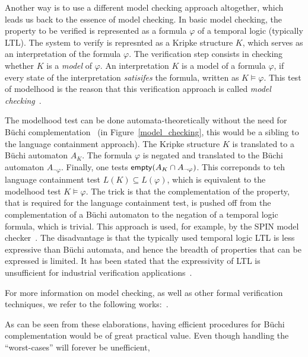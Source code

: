 Another way is to use a different model checking approach altogether, which leads us back to the essence of model checking. In basic model checking, the property to be verified is represented as a formula $\varphi$ of a temporal logic (typically LTL). The system to verify is represnted as a Kripke structure $K$, which serves as an interpretation of the formula $\varphi$. The verification step consists in checking whether $K$ is a \textit{model} of $\varphi$. An interpretation $K$ is a model of a formula $\varphi$, if every state of the interpretation \textit{satisifes} the formula, written as $K \models \varphi$. This test of modelhood is the reason that this verification approach is called \textit{model checking}~\cite{1996_vardi}.

The modelhood test can be done automata-theoretically without the need for Büchi complementation~\cite{2007_vardi_model_checking} (in Figure~\ref{model_checking}, this would be a sibling to the language containment approach). The Kripke structure $K$ is translated to a Büchi automaton $A_K$. The formula $\varphi$ is negated and translated to the Büchi automaton $A_{\neg\varphi}$. Finally, one tests $\text{\textsf{empty}}(A_K \cap A_{\neg\varphi})$. This correponds to teh language containment test $L(K) \subseteq L(\varphi)$, which is equivalent to the modelhood test $K \models \varphi$. The trick is that the complementation of the property, that is required for the language containment test, is pushed off from the complementation of a Büchi automaton to the negation of a temporal logic formula, which is trivial. This approach is used, for example, by the SPIN model checker~\cite{1997_spin}. The disadvantage is that the typically used temporal logic LTL is less expressive than Büchi automata, and hence the breadth of properties that can be expressed is limited. It has been stated that the expressivity of LTL is unsufficient for industrial verification applications~\cite{2007_vardi_model_checking}.

For more information on model checking, as well as other formal verification techniques, we refer to the following works:~\cite{huth2004logic}\cite{ben2012mathematical}\cite{baier2008principles}.

As can be seen from these elaborations, having efficient procedures for Büchi complementation would be of great practical value. Even though handling the ``worst-cases'' will forever be unefficient,



